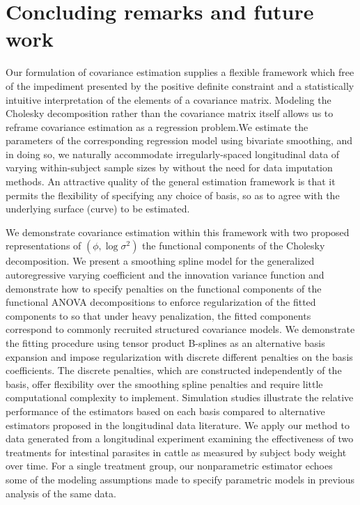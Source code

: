 
\chapter{Concluding remarks and future work}\label{concluding-remarks-chapter}




Our formulation of covariance estimation supplies a flexible framework which free of the impediment presented by the positive definite constraint and a statistically intuitive interpretation of the elements of a covariance matrix. Modeling the Cholesky decomposition rather than the covariance matrix itself allows us to reframe covariance estimation as a regression problem.We estimate the parameters of the corresponding regression model using bivariate smoothing, and in doing so, we naturally accommodate irregularly-spaced longitudinal data of varying within-subject sample sizes by without the need for data imputation methods. An attractive quality of the general estimation framework is that it permits the flexibility of specifying any choice of basis, so as to agree with the underlying surface (curve) to be estimated. 

\bigskip
We demonstrate covariance estimation within this framework with two proposed representations of $\left(\phi, \log\sigma^2\right)$ the functional components of the Cholesky decomposition. We present a smoothing spline model for the generalized autoregressive varying coefficient and the innovation variance function and demonstrate how to specify penalties on the functional components of the functional ANOVA decompositions to enforce regularization of the fitted components to so that under heavy penalization, the fitted components correspond to commonly recruited structured covariance models. We demonstrate the fitting procedure using tensor product B-splines as an alternative basis expansion and impose regularization with discrete different penalties on the basis coefficients. The discrete penalties, which are constructed independently of the basis, offer flexibility over the smoothing spline penalties and require little computational complexity to implement. Simulation studies illustrate the relative performance of the estimators based on each basis compared to alternative estimators proposed in the longitudinal data literature. We apply our method to data generated from a longitudinal experiment examining the effectiveness of two treatments for intestinal parasites in cattle as measured by subject body weight over time. For a single treatment group, our nonparametric estimator echoes some of the modeling assumptions made to specify parametric models in previous analysis of the same data.

